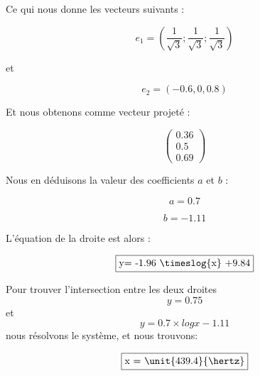 Ce qui nous donne les vecteurs suivants :

$$e_1=( \frac{1}{\sqrt{3}} ; \frac{1}{\sqrt{3}} ; \frac{1}{\sqrt{3}})$$

et

$$e_2=( -0.6, 0, 0.8)$$

Et nous obtenons comme vecteur projeté :

$$
\begin{pmatrix}  
	0.36\\
	0.5\\
	0.69
\end{pmatrix}
$$

Nous en déduisons la valeur des coefficients $a$ et $b$ :  

$$a =0.7$$

$$b= -1.11$$

L'équation de la droite est alors :

$$\fbox{y= -1.96 \timeslog{x} +9.84}$$

Pour trouver l'intersection entre les deux droites $$y=0.75$$ et $$y= 0.7 \times log{x} -1.11$$ nous résolvons le système, et nous trouvons: 

$$\fbox{x = \unit{439.4}{\hertz}}$$ 


